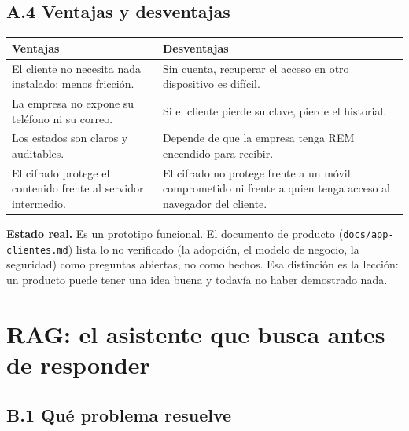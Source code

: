 \section{A.4 Ventajas y desventajas}\label{a.4-ventajas-y-desventajas}

{\def\LTcaptype{none} %
\begin{longtable}[]{@{}
  >{\raggedright\arraybackslash}p{}
  >{\raggedright\arraybackslash}p{}@{}}
\toprule\noalign{}
\begin{minipage}[b]{\linewidth}\raggedright
Ventajas
\end{minipage} & \begin{minipage}[b]{\linewidth}\raggedright
Desventajas
\end{minipage} \\
\midrule\noalign{}
\endhead
\bottomrule\noalign{}
\endlastfoot
El cliente no necesita nada instalado: menos fricción. & Sin cuenta, recuperar el acceso en otro dispositivo es difícil. \\
La empresa no expone su teléfono ni su correo. & Si el cliente pierde su clave, pierde el historial. \\
Los estados son claros y auditables. & Depende de que la empresa tenga REM encendido para recibir. \\
El cifrado protege el contenido frente al servidor intermedio. & El cifrado no protege frente a un móvil comprometido ni frente a quien tenga acceso al navegador del cliente. \\
\end{longtable}
}

\textbf{Estado real.} Es un prototipo funcional. El documento de producto (\texttt{docs/app-clientes.md}) lista lo no verificado (la adopción, el modelo de negocio, la seguridad) como preguntas abiertas, no como hechos. Esa distinción es la lección: un producto puede tener una idea buena y todavía no haber demostrado nada.

\chapter{RAG: el asistente que busca antes de responder}\label{cap:rag}\label{rag-el-asistente-que-busca-antes-de-responder}

\section{B.1 Qué problema resuelve}\label{b.1-quuxe9-problema-resuelve}

